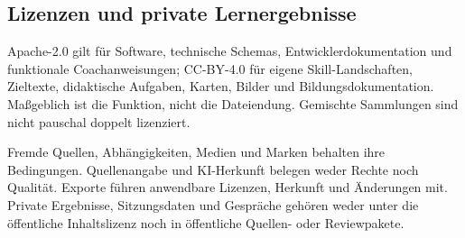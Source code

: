 \subsection{Lizenzen und private Lernergebnisse}

Apache-2.0 gilt für Software, technische Schemas, Entwicklerdokumentation
und funktionale Coachanweisungen; CC-BY-4.0 für eigene Skill-Landschaften,
Zieltexte, didaktische Aufgaben, Karten, Bilder und Bildungsdokumentation.
Maßgeblich ist die Funktion, nicht die Dateiendung. Gemischte Sammlungen
sind nicht pauschal doppelt lizenziert.

Fremde Quellen, Abhängigkeiten, Medien und Marken behalten ihre Bedingungen.
Quellenangabe und KI-Herkunft belegen weder Rechte noch Qualität.
Exporte führen anwendbare Lizenzen, Herkunft und Änderungen mit.
Private Ergebnisse, Sitzungsdaten und Gespräche gehören weder unter die
öffentliche Inhaltslizenz noch in öffentliche Quellen- oder Reviewpakete.

